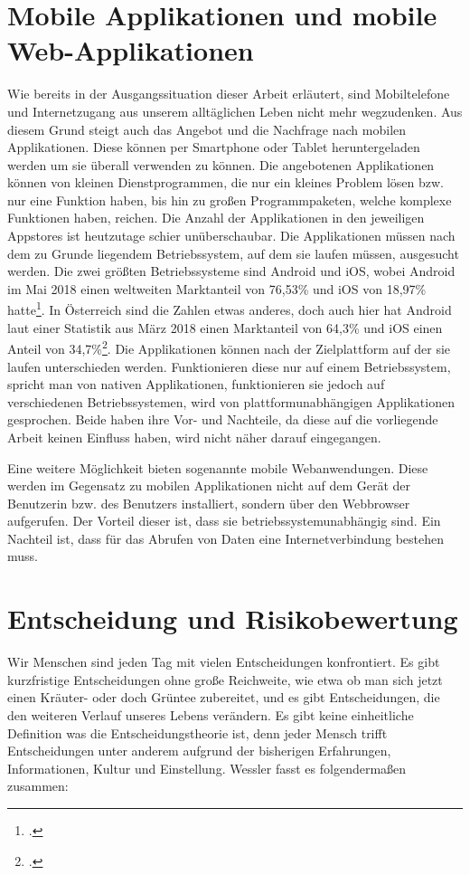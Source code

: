 \section{Mobile Applikationen und mobile Web-Applikationen}

Wie bereits in der Ausgangssituation dieser Arbeit erläutert, sind Mobiltelefone und Internetzugang aus unserem alltäglichen Leben nicht mehr wegzudenken. Aus diesem Grund steigt auch das Angebot und die Nachfrage nach mobilen Applikationen. Diese können per Smartphone oder Tablet heruntergeladen werden um sie überall verwenden zu können. Die angebotenen Applikationen können von kleinen Dienstprogrammen, die nur ein kleines Problem lösen bzw. nur eine Funktion haben, bis hin zu großen Programmpaketen, welche komplexe Funktionen haben, reichen. Die Anzahl der Applikationen in den jeweiligen Appstores ist heutzutage schier unüberschaubar. Die Applikationen müssen nach dem zu Grunde liegendem Betriebssystem, auf dem sie laufen müssen, ausgesucht werden. Die zwei größten Betriebssysteme sind Android und iOS, wobei Android im Mai 2018 einen weltweiten Marktanteil von 76,53\% und iOS von 18,97\% hatte\footcite{mobileos}. In Österreich sind die Zahlen etwas anderes, doch auch hier hat Android laut einer Statistik aus März 2018 einen Marktanteil von 64,3\% und iOS einen Anteil von 34,7\%\footcite{stat}.
Die Applikationen können nach der Zielplattform auf der sie laufen unterschieden werden. Funktionieren diese nur auf einem Betriebssystem, spricht man von nativen Applikationen, funktionieren sie jedoch auf verschiedenen Betriebssystemen, wird von plattformunabhängigen Applikationen gesprochen. Beide haben ihre Vor- und Nachteile, da diese auf die vorliegende Arbeit keinen Einfluss haben, wird nicht näher darauf eingegangen.

Eine weitere Möglichkeit bieten sogenannte mobile Webanwendungen. Diese werden im Gegensatz zu mobilen Applikationen nicht auf dem Gerät der Benutzerin bzw. des Benutzers installiert, sondern über den Webbrowser aufgerufen. Der Vorteil dieser ist, dass sie betriebssystemunabhängig sind. Ein Nachteil ist, dass für das Abrufen von Daten eine Internetverbindung bestehen muss.

\section{Entscheidung und Risikobewertung}

Wir Menschen sind jeden Tag mit vielen Entscheidungen konfrontiert. Es gibt kurzfristige Entscheidungen ohne große Reichweite, wie etwa ob man sich jetzt einen Kräuter- oder doch Grüntee zubereitet, und es gibt Entscheidungen, die den weiteren Verlauf unseres Lebens verändern. Es gibt keine einheitliche Definition was die Entscheidungstheorie ist, denn jeder Mensch trifft Entscheidungen unter anderem aufgrund der bisherigen Erfahrungen, Informationen, Kultur und Einstellung. Wessler fasst es folgendermaßen zusammen:

